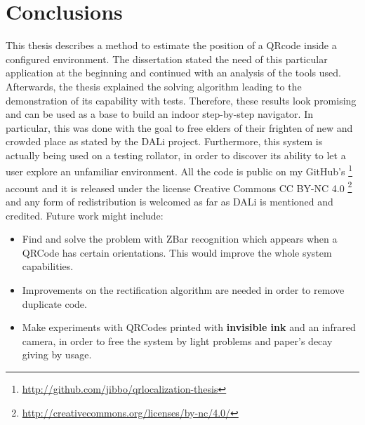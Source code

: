 \chapter{Conclusions}

This thesis describes a method to estimate the position of a QRcode inside a configured environment.
The dissertation stated the need of this particular application at the beginning and continued with an analysis of the tools used. Afterwards, the thesis explained the solving algorithm leading to the demonstration of its capability with tests. Therefore, these results look promising and can be used as a base to build an indoor step-by-step navigator. In particular, this was done with the goal to free elders of their frighten of new and crowded place as stated by the DALi project. Furthermore, this system is actually being used on a testing rollator, in order to discover its ability to let a user explore an unfamiliar environment. All the code is public on my GitHub's \footnote{ \url{http://github.com/jibbo/qrlocalization-thesis} } account and it is released under the license Creative Commons CC BY-NC 4.0 \footnote{\url{http://creativecommons.org/licenses/by-nc/4.0/}} and any form of redistribution is welcomed as far as DALi is mentioned and credited.\newline
Future work might include:
\begin{itemize}
	\item Find and solve the problem with ZBar recognition which appears when a QRCode has certain orientations. This would improve the whole system capabilities.
	\item Improvements on the rectification algorithm are needed in order to remove duplicate code.
	\item Make experiments with QRCodes printed with \textbf{invisible ink} and an infrared camera, in order to free the system by light problems and paper's decay giving by usage. 
\end{itemize}       